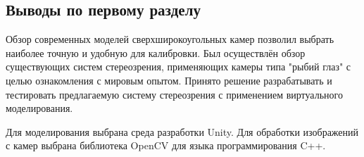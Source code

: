 \subsection{Выводы по первому разделу}

Обзор современных моделей сверхширокоугольных камер позволил выбрать 
наиболее точную и удобную для калибровки. Был осуществлён обзор существующих
систем стереозрения, применяющих камеры типа "рыбий глаз" с целью ознакомления 
с мировым опытом. Принято решение разрабатывать и тестировать предлагаемую 
систему стереозрения с применением виртуального  моделирования. 

Для моделирования выбрана среда разработки Unity. Для обработки изображений
с камер выбрана библиотека OpenCV для языка программирования C++. 